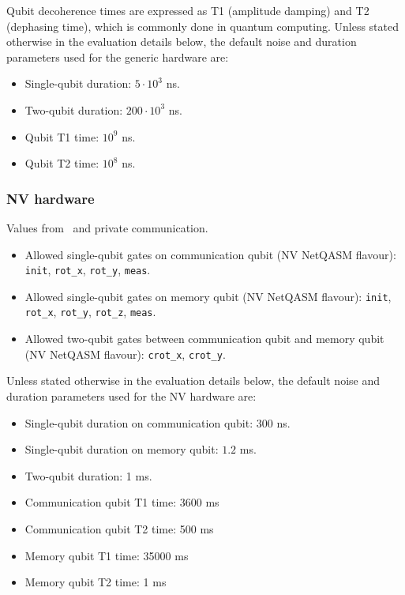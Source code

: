 Qubit decoherence times are expressed as T1 (amplitude damping) and T2 (dephasing time), which is commonly done in quantum computing.
Unless stated otherwise in the evaluation details below, the default noise and duration parameters used for the generic hardware are:
\begin{itemize}
  \item Single-qubit duration: $5 \cdot 10^3$ ns.
  \item Two-qubit duration: $200 \cdot 10^3$ ns.
  \item Qubit T1 time: $10^9$ ns.
  \item Qubit T2 time: $10^8$ ns.
\end{itemize}


\subsubsection{NV hardware}
Values from~\cite{avis2023requirements} and private communication.

\begin{itemize}
  \item Allowed single-qubit gates on communication qubit (NV NetQASM flavour): \texttt{init}, \texttt{rot\_x}, \texttt{rot\_y}, \texttt{meas}.
  \item Allowed single-qubit gates on memory qubit (NV NetQASM flavour): \texttt{init}, \texttt{rot\_x}, \texttt{rot\_y}, \texttt{rot\_z}, \texttt{meas}.
  \item Allowed two-qubit gates between communication qubit and memory qubit (NV NetQASM flavour): \texttt{crot\_x}, \texttt{crot\_y}.
\end{itemize}

Unless stated otherwise in the evaluation details below, the default noise and duration parameters used for the NV hardware are:
\begin{itemize}
  \item Single-qubit duration on communication qubit: 300 ns.
  \item Single-qubit duration on memory qubit: $1.2$ ms.
  \item Two-qubit duration: 1 ms.
  \item Communication qubit T1 time: 3600 ms
  \item Communication qubit T2 time: 500 ms
  \item Memory qubit T1 time: 35000 ms
  \item Memory qubit T2 time: 1 ms
\end{itemize}

